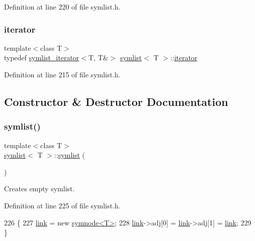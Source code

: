 Definition at line 220 of file symlist.\+h.

\mbox{\label{classsymlist_a66045fbe3d98975e5537092ede8b50df}} 
\subsubsection{\texorpdfstring{iterator}{iterator}}
{\footnotesize\ttfamily template$<$class T$>$ \\
typedef \mbox{\hyperlink{structsymlist__iterator}{symlist\+\_\+iterator}}$<$T, T\&$>$ \mbox{\hyperlink{classsymlist}{symlist}}$<$ T $>$\+::\mbox{\hyperlink{classsymlist_a66045fbe3d98975e5537092ede8b50df}{iterator}}}



Definition at line 215 of file symlist.\+h.



\subsection{Constructor \& Destructor Documentation}
\mbox{\label{classsymlist_a678dc0ddb02994195a2359a361ee0ea6}} 
\subsubsection{\texorpdfstring{symlist()}{symlist()}\hspace{0.1cm}{\footnotesize\ttfamily [1/2]}}
{\footnotesize\ttfamily template$<$class T$>$ \\
\mbox{\hyperlink{classsymlist}{symlist}}$<$ T $>$\+::\mbox{\hyperlink{classsymlist}{symlist}} (\begin{DoxyParamCaption}{ }\end{DoxyParamCaption})\hspace{0.3cm}{\ttfamily [inline]}}



Creates empty symlist. 



Definition at line 225 of file symlist.\+h.


\begin{DoxyCode}
226     \{
227     \mbox{\hyperlink{classsymlist_a8fa81a7f6d0bb986bb593776db582c90}{link}} = \textcolor{keyword}{new} \mbox{\hyperlink{structsymnode}{symnode<T>}};
228     \mbox{\hyperlink{classsymlist_a8fa81a7f6d0bb986bb593776db582c90}{link}}->adj[0] = \mbox{\hyperlink{classsymlist_a8fa81a7f6d0bb986bb593776db582c90}{link}}->adj[1] = \mbox{\hyperlink{classsymlist_a8fa81a7f6d0bb986bb593776db582c90}{link}};
229     \}
\end{DoxyCode}
\mbox{\label{classsymlist_a5c17d54592dac03b2c4d940a10153797}} 
